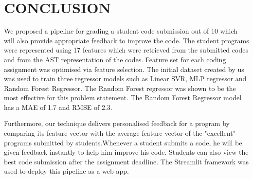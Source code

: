 \chapter{CONCLUSION}

We proposed a pipeline for grading a student code submission out of 10
which will also provide appropriate feedback to improve the code. The student programs were represented using 17 features which were retrieved from the submitted codes and from the AST representation of the codes. Feature set for each coding
assignment was optimised via feature selection. The initial dataset
created by us was used to train three regressor models such as Linear SVR, MLP regressor and Random Forest
Regressor. The Random Forest regressor was shown to be the most
effective for this problem statement. The Random Forest Regressor model
has a MAE of 1.7 and RMSE of 2.3.

Furthermore, our technique delivers personalised feedback for a program by comparing its feature vector with the average feature vector of the "excellent" programs submitted by students.Whenever a student submits a
code, he will be given feedback instantly to help him improve his
code.  Students can also view the best code submission after the
assignment deadline. The Streamlit framework was used to deploy this
pipeline as a web app.
